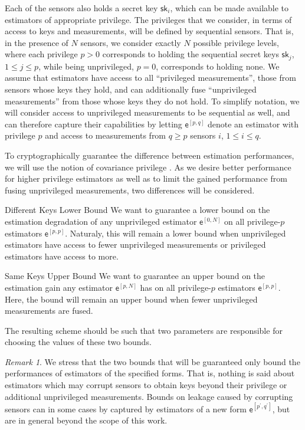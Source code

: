 \documentclass[conference]{IEEEtran}
\theoremstyle{definition}
\theoremstyle{remark}
\newtheorem*{remark}{Remark}
\begin{document}
Each of the sensors also holds a secret key $\mathsf{sk}_i$, which can be made available to estimators of appropriate privilege. The privileges that we consider, in terms of access to keys and measurements, will be defined by sequential sensors. That is, in the presence of $N$ sensors, we consider exactly $N$ possible privilege levels, where each privilege $p>0$ corresponds to holding the sequential secret keys $\mathsf{sk}_j$, $1\leq j \leq p$, while being unprivileged, $p=0$, corresponds to holding none. We assume that estimators have access to all ``privileged measurements'', those from sensors whose keys they hold, and can additionally fuse ``unprivileged measurements'' from those whose keys they do not hold. To simplify notation, we will consider access to unprivileged measurements to be sequential as well, and can therefore capture their capabilities by letting $\mathsf{e}^{[p,q]}$ denote an estimator with privilege $p$ and access to measurements from $q\geq p$ sensors $i$, $1\leq i \leq q$.

To cryptographically guarantee the difference between estimation performances, we will use the notion of covariance privilege \cite{risticCryptographicallyPrivilegedState2022}. As we desire better performance for higher privilege estimators as well as to limit the gained performance from fusing unprivileged measurements, two differences will be considered.
\begin{LaTeXdescription}
  \item[Different Keys Lower Bound] We want to guarantee a lower bound on the estimation degradation of any unprivileged estimator $\mathsf{e}^{[0,N]}$ on all privilege-$p$ estimators $\mathsf{e}^{[p,p]}$. Naturaly, this will remain a lower bound when unprivileged estimators have access to fewer unprivileged measurements or privileged estimators have access to more.
  \item[Same Keys Upper Bound] We want to guarantee an upper bound on the estimation gain any estimator $\mathsf{e}^{[p,N]}$ has on all privilege-$p$ estimators $\mathsf{e}^{[p,p]}$. Here, the bound will remain an upper bound when fewer unprivileged measurements are fused.
\end{LaTeXdescription}
The resulting scheme should be such that two parameters are responsible for choosing the values of these two bounds.
\begin{remark}
  We stress that the two bounds that will be guaranteed only bound the performances of estimators of the specified forms. That is, nothing is said about estimators which may corrupt sensors to obtain keys beyond their privilege or additional unprivileged measurements. Bounds on leakage caused by corrupting sensors can in some cases by captured by estimators of a new form $\mathsf{e}^{[p^\prime,q^\prime]}$, but are in general beyond the scope of this work.
\end{remark}
\end{document}
